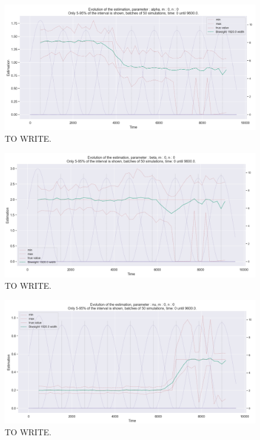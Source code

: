 \begin{figure}
\centering
\includegraphics[width = 0.90 \textwidth]{../imag/chap3/2/Figure_2.png}
\caption{TO WRITE.}
\label{fig:first_estimate_2_alpha}
\end{figure}

\begin{figure}
\centering
\includegraphics[width = 0.90 \textwidth]{../imag/chap3/2/Figure_3.png}
\caption{TO WRITE.}
\label{fig:first_estimate_2_beta}
\end{figure}

\begin{figure}
\centering
\includegraphics[width = 0.90 \textwidth]{../imag/chap3/2/Figure_4.png}
\caption{TO WRITE.}
\label{fig:first_estimate_2_nu}
\end{figure}





















